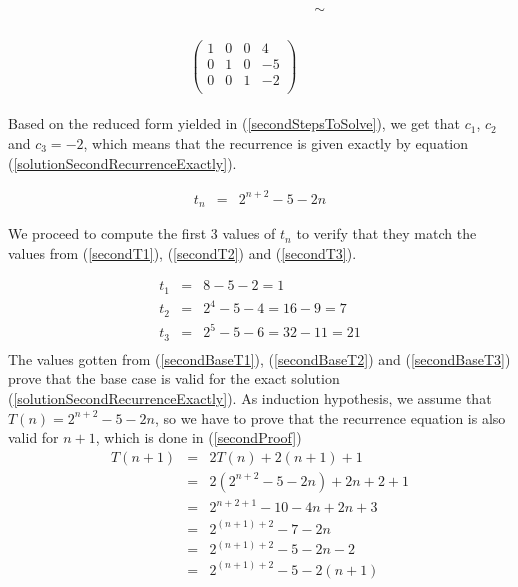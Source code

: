 \documentclass[12pt]{scrartcl}
\begin{document}
\begin{enumerate}
\begin{enumerate}
\begin{equation}
\begin{split}
\begin{array}{cccccc}
\begin{array}{c}
					\end{array}
										&
					\begin{array}{c}
					 \\
					 \sim\\
					 \\
					\end{array}
					\\
					\\
					\left(
					\begin{array}{ccc|c}
						1	&	0	&	0	&	4 \\
						0	&	1			&	0			&	-5 \\
						0	&	0			&	1			&	-2 \\
					\end{array}
					\right)
				\end{array}
				\end{split}
			\end{equation}

			Based on the reduced form yielded in (\ref{secondStepsToSolve}), we get that $c_1$, $c_2$ and $c_3 = -2$, which means that the recurrence is given exactly by equation (\ref{solutionSecondRecurrenceExactly}).
			
			\begin{eqnarray}\label{solutionSecondRecurrenceExactly}
				t_n	&	=	&	2^{n + 2} - 5 - 2n
			\end{eqnarray}
			
			We proceed to compute the first 3 values of $t_n$ to verify that they match the  values from  (\ref{secondT1}), (\ref{secondT2}) and (\ref{secondT3}).
			
			\begin{eqnarray}
				t_1	&	=	&	8 - 5 - 2  = 1\label{secondBaseT1}\\
				t_2	&	=	&	2^4 - 5 -4 = 16 - 9 = 7\label{secondBaseT2}\\
				t_3	&	=	&	2^5 - 5 -6 = 32 - 11 = 21\label{secondBaseT3}\\
			\end{eqnarray}
			The values gotten from (\ref{secondBaseT1}), (\ref{secondBaseT2}) and (\ref{secondBaseT3}) prove that the base case is valid for the exact solution (\ref{solutionSecondRecurrenceExactly}). As induction hypothesis, we assume that $T(n) = 2^{n + 2} - 5 - 2n$, so we have to prove that the recurrence equation is also valid for $n + 1$, which is done in (\ref{secondProof})
				\begin{eqnarray}
				T(n + 1)		&	=	&	2T(n) + 2(n + 1) + 1 \nonumber\\
							&	=	&	2(2^{n + 2} - 5 - 2n) + 2n + 2 +1 \nonumber \\
							&	=	&	2^{n + 2 + 1} - 10 - 4n + 2n + 3 \nonumber \\
							&	=	&	2^{(n + 1) + 2} - 7 - 2n  \nonumber \\
							&	=	&	2^{(n + 1) + 2} - 5 - 2n  - 2 \nonumber \\
							&	=	&	2^{(n + 1) + 2} - 5 - 2(n  + 1) \label{secondProof}
				\end{eqnarray}
				

\end{enumerate}
\end{enumerate}
\end{document}
